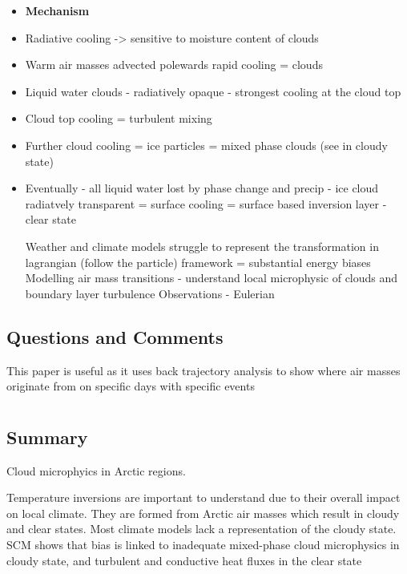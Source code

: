 \documentclass{article}
\begin{document}
\begin{itemize}
\item \textbf{Mechanism }
\item  Radiative cooling -> sensitive to moisture content of clouds
\item Warm air masses advected polewards rapid cooling = clouds
\item Liquid water clouds - radiatively opaque - strongest cooling at the cloud top
\item Cloud top cooling = turbulent mixing
\item Further cloud cooling = ice particles = mixed phase clouds (see in cloudy state)
\item Eventually - all liquid water lost by phase change and precip - ice cloud radiatvely transparent = surface cooling = surface based inversion layer - clear state 

Weather and climate models struggle to represent the transformation in lagrangian (follow the particle) framework 
= substantial energy biases 
Modelling air mass transitions - understand local microphysic of clouds and boundary layer turbulence 
Observations - Eulerian 
\end{itemize}
\subsection*{Questions and Comments}
This paper is useful as it uses back trajectory analysis to show where air masses originate from on specific days with specific events 
\newpage
\clearpage
\newpage
\clearpage




\def \sect {Pithan2014}
\section{\citeauthor{\sect} \citeyear{\sect}}
\textbf{\citefield{\sect}{title}\nocite{\sect}}
\subsection*{Summary}
Cloud microphyics in Arctic regions.

Temperature inversions are important to understand due to their overall impact on local climate. They are formed from Arctic air masses which result in cloudy and clear states. Most climate models lack a representation of the cloudy state. SCM shows that bias is linked to inadequate mixed-phase cloud microphysics in cloudy state, and turbulent and conductive heat fluxes in the clear state
\end{document}

